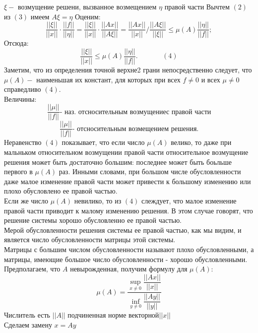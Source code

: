\documentclass[14pt, titlepage,fleqn]{extarticle}
\begin{document}
	$\xi  - $ возмущение решени, вызванное возмещением $\eta$ правой части 
	Вычтем $(2)$ из $(3)$ имеем $A\xi  = \eta$
	Оценим:
	\[\dfrac{||\xi||}{||x||} \cdot \dfrac{||f||}{||\eta||} = \dfrac{||\xi||}{||x||} \cdot \dfrac{||Ax||}{||A\xi||} = \dfrac{||Ax||}{||x||}/ \dfrac{||A\xi||}{||\xi||}\leq \mu(A)\dfrac{||\eta||}{||f||};\]
	Отсюда:
	\[\dfrac{||\xi||}{||x||} \leq \mu(A)\dfrac{||\eta||}{||f||}. ~~~~~~~~~~~~~~~~(4)\]
	Заметим, что из определения точной верхне2 грани непосредственно следует, что $\mu(A) - $ наименьшая их констант, для которых при всех $f \neq 0$ и всех $\mu \neq 0$  справедливо $(4)$.\\
	Величины:
	\newpage
	\[\dfrac{||\mu||}{||f||} \text{- наз. отсносительным возмущениес правой части}\] 
	\[\dfrac{||\mu||}{||f||} \text{- отсносительным возмещением решения.}\] 
	Неравенство $(4)$ показывает, что если число $\mu(A)$ велико, то даже при мальньком относительном возмущении правой части относительное возмущение решения может быть достаточно большим: последнее может быть боьльше первого в $\mu(A)$ раз. Инными словами, при большом числе обусловленности даже малое изменение правой части может привести к большому изменению или плохо обусловлено ее правой частью.\\
	Если же число $\mu(A)$ невилико, то из $(4)$ слеждует, что малое изменение правой части приводит к малому изменению решения. В этом случае говорят, что решение системы хорошо обусловленно ее правой частью. \\
	Мерой обусловленности решения системы ее правой частью, как мы видим, и является число обусловленности матрицы этой системы.\\
	Матрицы с большим числом обусловленности называют плохо обусловленными, а матрицы, имеющие большое число обусловленности - хорошо обусловленными.\\
	Предполагаем, что $A$ невырожденная, получим формулу для $\mu(A):$
	\[\mu(A) = \dfrac{\underset{x \neq 0}{\sup} \dfrac{||Ax||}{||x||}}{\underset{y \neq 0}{\inf} \dfrac{||Ay||}{||y||}}\] 
	Числитель есть $||A||$ подчиненная норме векторной$||x||$\\
	Сделаем замену $x = Ay$
\end{document}
